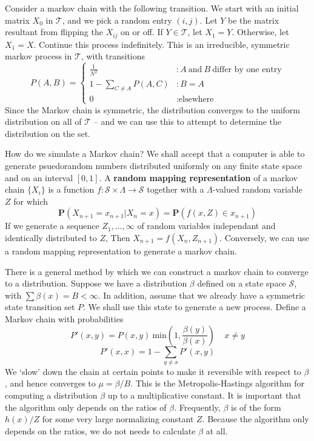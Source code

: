 Consider a markov chain with the following transition. We start with an initial matrix $X_0$ in $\mathcal{T}$, and we pick a random entry $(i,j)$. Let $Y$ be the matrix resultant from flipping the $X_{ij}$ on or off. If $Y \in \mathcal{T}$, let $X_1 = Y$. Otherwise, let $X_1 = X$. Continue this process indefinitely. This is an irreducible, symmetric markov process in $\mathcal{T}$, with transitions
%
\[
    P(A,B) =
    \begin{cases}
        \frac{1}{N^2} & : A\ \text{and}\ B\ \text{differ by one entry}\\
        1 - \sum_{C \neq A} P(A,C) & : B = A\\
        0 & : \text{elsewhere}
    \end{cases}
\]
%
Since the Markov chain is symmetric, the distribution converges to the uniform distribution on all of $\mathcal{T}$ -- and we can use this to attempt to determine the distribution on the set.

How do we simulate a Markov chain? We shall accept that a computer is able to generate psuedorandom numbers distributed uniformly on any finite state space and on an interval $[0,1]$. A {\bf random mapping representation} of a markov chain $\{ X_i \}$ is a function $f:\mathcal{S} \times \Lambda \to \mathcal{S}$ together with a $\Lambda$-valued random variable $Z$ for which
%
\[ \mathbf{P}(X_{n+1} = x_{n+1} | X_n = x) = \mathbf{P}(f(x,Z) \in x_{n+1}) \]
%
If we generate a sequence $Z_1, \dots, \infty$ of random variables independant and identically distributed to $Z$, Then $X_{n+1} = f(X_n,Z_{n+1})$. Conversely, we can use a random mapping representation to generate a markov chain.

There is a general method by which we can construct a markov chain to converge to a distribution. Suppose we have a distribution $\beta$ defined on a state space $\mathcal{S}$, with $\sum \beta(x) = B < \infty$. In addition, assume that we already have a symmetric state transition set $P$. We shall use this state to generate a new process. Define a Markov chain with probabilities
%
\[ P'(x,y) = P(x,y)\ \text{min}(1, \frac{\beta(y)}{\beta(x)})\ \ \ \ \ x \neq y \]
%
\[ P'(x,x) = 1 - \sum_{y \neq x} P'(x,y) \]
%
We `slow' down the chain at certain points to make it reversible with respect to $\beta$, and hence converges to $\mu = \beta/B$. This is the Metropolis-Hastings algorithm for computing a distribution $\beta$ up to a multiplicative constant. It is important that the algorithm only depends on the ratios of $\beta$. Frequently, $\beta$ is of the form $h(x)/Z$ for some very large normalizing constant $Z$. Because the algorithm only depends on the ratios, we do not needs to calculate $\beta$ at all.

























